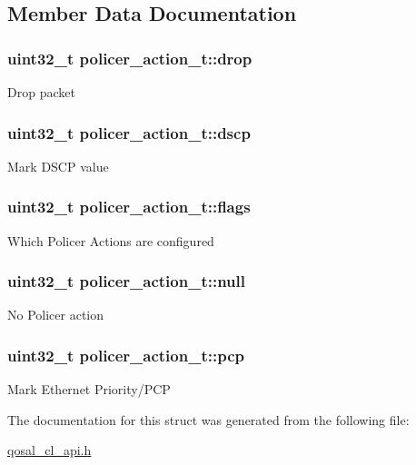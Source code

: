 \subsection{Member Data Documentation}
\hypertarget{structpolicer__action__t_a88142da078f1f4a4fc58d237fe1c4f72}{
\subsubsection[{drop}]{\setlength{\rightskip}{0pt plus 5cm}uint32\-\_\-t policer\-\_\-action\-\_\-t\-::drop}}\label{structpolicer__action__t_a88142da078f1f4a4fc58d237fe1c4f72}
Drop packet \hypertarget{structpolicer__action__t_a6ea36f2d6f975b01d8c47c12240056eb}{
\subsubsection[{dscp}]{\setlength{\rightskip}{0pt plus 5cm}uint32\-\_\-t policer\-\_\-action\-\_\-t\-::dscp}}\label{structpolicer__action__t_a6ea36f2d6f975b01d8c47c12240056eb}
Mark D\-S\-C\-P value \hypertarget{structpolicer__action__t_a7363bf3022ed06fc1c65a1cbd8cd9669}{
\subsubsection[{flags}]{\setlength{\rightskip}{0pt plus 5cm}uint32\-\_\-t policer\-\_\-action\-\_\-t\-::flags}}\label{structpolicer__action__t_a7363bf3022ed06fc1c65a1cbd8cd9669}
Which Policer Actions are configured \hypertarget{structpolicer__action__t_aba06d862c7402db050b118d8b2ce5806}{
\subsubsection[{null}]{\setlength{\rightskip}{0pt plus 5cm}uint32\-\_\-t policer\-\_\-action\-\_\-t\-::null}}\label{structpolicer__action__t_aba06d862c7402db050b118d8b2ce5806}
No Policer action \hypertarget{structpolicer__action__t_a85f7392c987b5c828a2ac57c29ec8438}{
\subsubsection[{pcp}]{\setlength{\rightskip}{0pt plus 5cm}uint32\-\_\-t policer\-\_\-action\-\_\-t\-::pcp}}\label{structpolicer__action__t_a85f7392c987b5c828a2ac57c29ec8438}
Mark Ethernet Priority/\-P\-C\-P 

The documentation for this struct was generated from the following file\-:\begin{DoxyCompactItemize}
\item 
\hyperlink{qosal__cl__api_8h}{qosal\-\_\-cl\-\_\-api.\-h}\end{DoxyCompactItemize}
